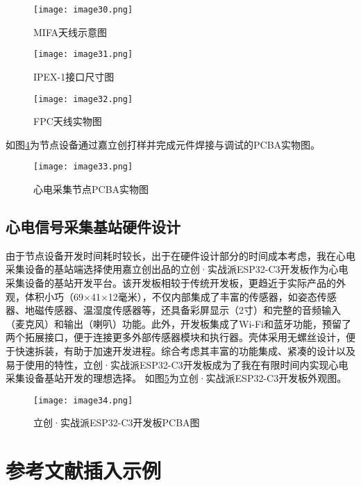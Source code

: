 \begin{figure}[htb]
    \centering
    \texttt{[image: image30.png]}
    \caption{MIFA天线示意图}
    \label{F.ECG_image30}
\end{figure}

\begin{figure}[htb]
    \centering
    \texttt{[image: image31.png]}
    \caption{IPEX-1接口尺寸图}
    \label{F.ECG_image31}
\end{figure}

\begin{figure}[H]
    \centering
    \texttt{[image: image32.png]}
    \caption{FPC天线实物图\cite{FPC天线}}
    \label{F.ECG_image32}
\end{figure}

如图\ref{F.ECG_image33}为节点设备通过嘉立创打样并完成元件焊接与调试的PCBA实物图。

\begin{figure}[htb]
    \centering
    \texttt{[image: image33.png]}
    \caption{心电采集节点PCBA实物图}
    \label{F.ECG_image33}
\end{figure}

\subsection{心电信号采集基站硬件设计}

由于节点设备开发时间耗时较长，出于在硬件设计部分的时间成本考虑，我在心电采集设备的基站端选择使用嘉立创出品的立创·实战派ESP32-C3开发板作为心电采集设备的基站开发平台。该开发板相较于传统开发板，更趋近于实际产品的外观，体积小巧（69×41×12毫米），不仅内部集成了丰富的传感器，如姿态传感器、地磁传感器、温湿度传感器等，还具备彩屏显示（2寸）和完整的音频输入（麦克风）和输出（喇叭）功能。此外，开发板集成了Wi-Fi和蓝牙功能，预留了两个拓展接口，便于连接更多外部传感器模块和执行器。壳体采用无螺丝设计，便于快速拆装，有助于加速开发进程。综合考虑其丰富的功能集成、紧凑的设计以及易于使用的特性，立创·实战派ESP32-C3开发板成为了我在有限时间内实现心电采集设备基站开发的理想选择。 如图\ref{F.ECG_image34}为立创·实战派ESP32-C3开发板外观图。

\begin{figure}[htb]
    \centering
    \texttt{[image: image34.png]}
    \caption{立创·实战派ESP32-C3开发板PCBA图}
    \label{F.ECG_image34}
\end{figure}

\section{参考文献插入示例}

